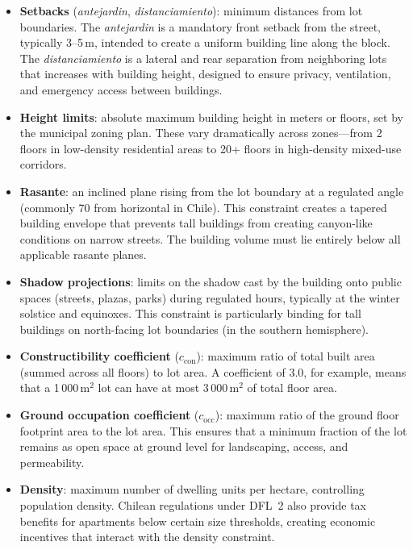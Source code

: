 \documentclass[11pt,a4paper]{article}
\begin{document}
\begin{itemize}[nosep]
    \item \textbf{Setbacks} (\emph{antejardin}, \emph{distanciamiento}):
    minimum distances from lot boundaries. The \emph{antejardin} is a
    mandatory front setback from the street, typically 3--5\,m, intended
    to create a uniform building line along the block. The
    \emph{distanciamiento} is a lateral and rear separation from
    neighboring lots that increases with building height, designed to
    ensure privacy, ventilation, and emergency access between buildings.

    \item \textbf{Height limits}: absolute maximum building height in
    meters or floors, set by the municipal zoning plan. These vary
    dramatically across zones---from 2 floors in low-density residential
    areas to 20+ floors in high-density mixed-use corridors.

    \item \textbf{Rasante}: an inclined plane rising from the lot boundary
    at a regulated angle (commonly 70\textdegree{} from horizontal in
    Chile). This constraint creates a tapered building envelope that
    prevents tall buildings from creating canyon-like conditions on narrow
    streets. The building volume must lie entirely below all applicable
    rasante planes.

    \item \textbf{Shadow projections}: limits on the shadow cast by the
    building onto public spaces (streets, plazas, parks) during
    regulated hours, typically at the winter solstice and equinoxes.
    This constraint is particularly binding for tall buildings on
    north-facing lot boundaries (in the southern hemisphere).

    \item \textbf{Constructibility coefficient} ($c_{\text{con}}$):
    maximum ratio of total built area (summed across all floors) to lot
    area. A coefficient of 3.0, for example, means that a 1\,000\,m$^2$
    lot can have at most 3\,000\,m$^2$ of total floor area.

    \item \textbf{Ground occupation coefficient} ($c_{\text{occ}}$):
    maximum ratio of the ground floor footprint area to the lot area.
    This ensures that a minimum fraction of the lot remains as open
    space at ground level for landscaping, access, and permeability.

    \item \textbf{Density}: maximum number of dwelling units per hectare,
    controlling population density. Chilean regulations under DFL~2
    also provide tax benefits for apartments below certain size thresholds,
    creating economic incentives that interact with the density constraint.
\end{itemize}
\end{document}
